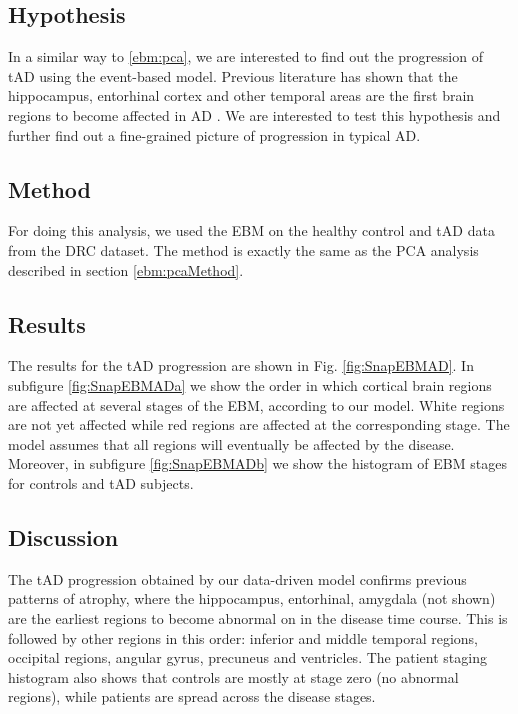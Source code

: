 \subsection{Hypothesis}

In a similar way to \ref{ebm:pca}, we are interested to find out the progression of tAD using the event-based model. Previous literature has shown that the hippocampus, entorhinal cortex and other temporal areas are the first brain regions to become affected in AD \cite{braak1991neuropathological,convit1995hippocampal,xu2000usefulness}. We are interested to test this hypothesis and further find out a fine-grained picture of progression in typical AD.  

\subsection{Method}
\label{ebm:adMethod}

For doing this analysis, we used the EBM on the healthy control and tAD data from the DRC dataset. The method is exactly the same as the PCA analysis described in section \ref{ebm:pcaMethod}. 


\subsection{Results}

The results for the tAD progression are shown in Fig. \ref{fig:SnapEBMAD}. In subfigure \ref{fig:SnapEBMADa} we show the order in which cortical brain regions are affected at several stages of the EBM, according to our model. White regions are not yet affected while red regions are affected at the corresponding stage. The model assumes that all regions will eventually be affected by the disease. Moreover, in subfigure \ref{fig:SnapEBMADb} we show the histogram of EBM stages for controls and tAD subjects. 

\newcommand*{\snapLocationAD}{images/ebm/mriAllGaussUnifDirAD/snapshots} %
\newcommand*{\captionSnapEBMAD}{\caption{(a) Timing of atrophy in AD subjects according to the Event-based Model. White regions have not been affected, while red regions have been affected by the corresponding stage. (b) The histogram of EBM stages for controls and AD subjects.}\label{fig:SnapEBMAD}}


\subsection{Discussion}
The tAD progression obtained by our data-driven model confirms previous patterns of atrophy, where the hippocampus, entorhinal, amygdala (not shown) are the earliest regions to become abnormal on in the disease time course. This is followed by other regions in this order: inferior and middle temporal regions, occipital regions, angular gyrus, precuneus and ventricles. The patient staging histogram also shows that controls are mostly at stage zero (no abnormal regions), while patients are spread across the disease stages.

